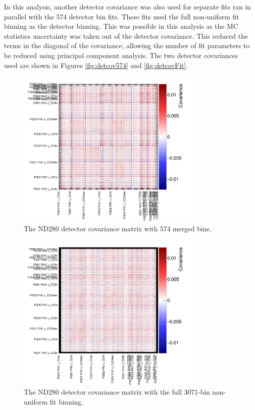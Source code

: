 In this analysis, another detector covariance was also used for separate fits ran in parallel with the 574 detector bin fits. These fits used the full non-uniform fit binning as the detector binning. This was possible in this analysis as the MC statistics uncertainty was taken out of the detector covariance. This reduced the terms in the diagonal of the covariance, allowing the number of fit parameters to be reduced using principal component analysis. The two detector covariances used are shown in Figures \ref{fig:detcov574} and \ref{fig:detcovFit}.

\begin{figure}[h]
\centering
\includegraphics*[width=0.8\textwidth,clip]{figs/detcov574}
\caption{The ND280 detector covariance matrix with 574 merged bins.}\label{fig:detcorr574}
\end{figure}

\begin{figure}[h]
\centering
\includegraphics*[width=0.8\textwidth,clip]{figs/detcovFit}
\caption{The ND280 detector covariance matrix with the full 3071-bin non-uniform fit binning.}\label{fig:detcorrFit}
\end{figure}

